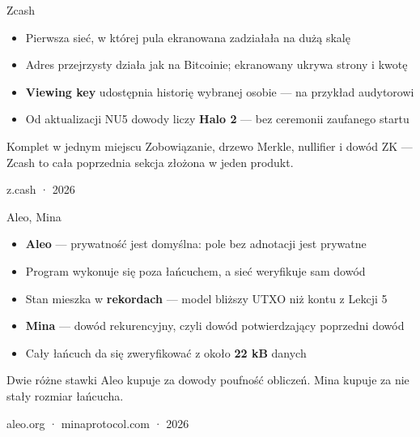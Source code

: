 \begin{frame}{Zcash}
  \begin{itemize}
    \item Pierwsza sieć, w której pula ekranowana zadziałała na dużą skalę
    \item Adres przejrzysty działa jak na Bitcoinie; ekranowany ukrywa strony i kwotę
    \item \textbf{Viewing key} udostępnia historię wybranej osobie --- na przykład audytorowi
    \item Od aktualizacji NU5 dowody liczy \textbf{Halo 2} --- bez ceremonii zaufanego startu
  \end{itemize}
  \vspace{0.1cm}
  \begin{exampleblock}{Komplet w jednym miejscu}
    Zobowiązanie, drzewo Merkle, nullifier i dowód ZK ---
    Zcash to cała poprzednia sekcja złożona w jeden produkt.
  \end{exampleblock}
  \vspace{-0.1cm}
  \begin{flushright}
    \textcolor{stplmuted}{\tiny z.cash · 2026}
  \end{flushright}
\end{frame}

\begin{frame}{Aleo, Mina}
  \begin{itemize}
    \item \textbf{Aleo} --- prywatność jest domyślna: pole bez adnotacji jest prywatne
    \item Program wykonuje się poza łańcuchem, a sieć weryfikuje sam dowód
    \item Stan mieszka w \textbf{rekordach} --- model bliższy UTXO niż kontu z Lekcji 5
    \item \textbf{Mina} --- dowód rekurencyjny, czyli dowód potwierdzający poprzedni dowód
    \item Cały łańcuch da się zweryfikować z około \textbf{22 kB} danych
  \end{itemize}
  \vspace{0.1cm}
  \begin{block}{Dwie różne stawki}
    Aleo kupuje za dowody poufność obliczeń.
    Mina kupuje za nie stały rozmiar łańcucha.
  \end{block}
  \vspace{-0.1cm}
  \begin{flushright}
    \textcolor{stplmuted}{\tiny aleo.org · minaprotocol.com · 2026}
  \end{flushright}
\end{frame}

